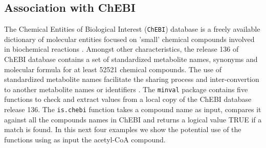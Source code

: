 \subsection*{Association with ChEBI}
The Chemical Entities of Biological Interest (\texttt{ChEBI}) database  is a freely available dictionary of molecular entities focused on 'small' chemical compounds involved in biochemical reactions \cite{Degtyarenko2007}. Amongst other characteristics, the release 136 of ChEBI database contains a set of standardized metabolite names, synonyms and molecular formula for at least 52521 chemical compounds. The use of standardized metabolite names facilitate the sharing process and inter-convertion to another metabolite names  or identifiers \cite{Bernard2014, Ravikrishnan2015}. The \texttt{minval} package contains five functions to check and extract values from a local copy of the ChEBI database release 136. The \texttt{is.chebi} function takes a compound name as input, compares it against all the compounds names in ChEBI and returns a logical value TRUE if a match is found. In this next four examples we show the potential use of the functions using as input the acetyl-CoA compound.
